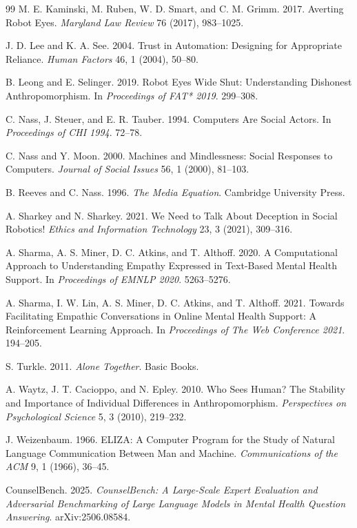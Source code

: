 \documentclass[manuscript,review,anonymous]{acmart}
\begin{document}
\begin{thebibliography}{99}
M. E. Kaminski, M. Ruben, W. D. Smart, and C. M. Grimm.
2017.
Averting Robot Eyes.
\textit{Maryland Law Review} 76 (2017), 983--1025.

J. D. Lee and K. A. See.
2004.
Trust in Automation: Designing for Appropriate Reliance.
\textit{Human Factors} 46, 1 (2004), 50--80.

B. Leong and E. Selinger.
2019.
Robot Eyes Wide Shut: Understanding Dishonest Anthropomorphism.
In \textit{Proceedings of FAT* 2019}. 299--308.

C. Nass, J. Steuer, and E. R. Tauber.
1994.
Computers Are Social Actors.
In \textit{Proceedings of CHI 1994}. 72--78.

C. Nass and Y. Moon.
2000.
Machines and Mindlessness: Social Responses to Computers.
\textit{Journal of Social Issues} 56, 1 (2000), 81--103.

B. Reeves and C. Nass.
1996.
\textit{The Media Equation}.
Cambridge University Press.

A. Sharkey and N. Sharkey.
2021.
We Need to Talk About Deception in Social Robotics!
\textit{Ethics and Information Technology} 23, 3 (2021), 309--316.

A. Sharma, A. S. Miner, D. C. Atkins, and T. Althoff.
2020.
A Computational Approach to Understanding Empathy Expressed in Text-Based Mental Health Support.
In \textit{Proceedings of EMNLP 2020}. 5263--5276.

A. Sharma, I. W. Lin, A. S. Miner, D. C. Atkins, and T. Althoff.
2021.
Towards Facilitating Empathic Conversations in Online Mental Health Support: A Reinforcement Learning Approach.
In \textit{Proceedings of The Web Conference 2021}. 194--205.

S. Turkle.
2011.
\textit{Alone Together}.
Basic Books.

A. Waytz, J. T. Cacioppo, and N. Epley.
2010.
Who Sees Human? The Stability and Importance of Individual Differences in Anthropomorphism.
\textit{Perspectives on Psychological Science} 5, 3 (2010), 219--232.

J. Weizenbaum.
1966.
ELIZA: A Computer Program for the Study of Natural Language Communication Between Man and Machine.
\textit{Communications of the ACM} 9, 1 (1966), 36--45.

CounselBench. 2025. \textit{CounselBench: A Large-Scale Expert Evaluation and Adversarial Benchmarking of Large Language Models in Mental Health Question Answering}. arXiv:2506.08584.


\end{thebibliography}
\end{document}
